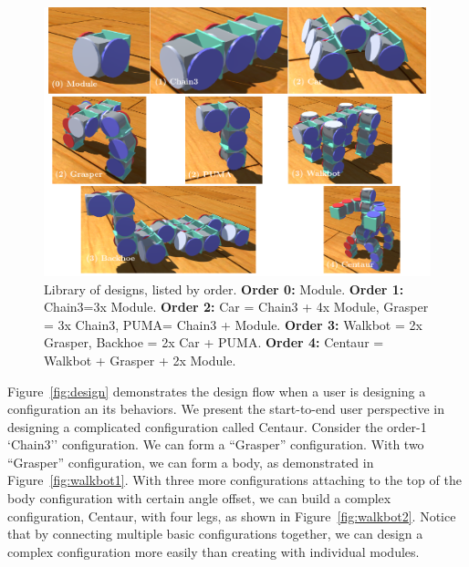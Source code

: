 \documentclass[graybox]{svmult}
\begin{document}
\begin{figure}
  \begin{center}
    \includegraphics[width=\textwidth]{images/library/bigGrid.pdf}
    \caption{Library of designs, listed by order. 
    \textbf{Order 0:} Module. \textbf{Order 1:} Chain3=3x Module.
    \textbf{Order 2:} Car = Chain3 + 4x Module, Grasper = 3x Chain3, PUMA= Chain3 + Module.
    \textbf{Order 3:} Walkbot = 2x Grasper, Backhoe = 2x Car + PUMA.
    \textbf{Order 4:} Centaur = Walkbot + Grasper + 2x Module.}
    \label{fig:library}
  \end{center}
\end{figure}



Figure~\ref{fig:design} demonstrates the design flow when a user is designing a configuration an its behaviors. We present the start-to-end user perspective in designing a complicated configuration called Centaur. Consider the
order-1 `Chain3'' configuration. We can form a ``Grasper'' configuration. With two ``Grasper'' configuration, we can form a body, as demonstrated in Figure~\ref{fig:walkbot1}. With three more configurations attaching to the top of the body configuration with certain angle offset, we can build a complex configuration, Centaur, with four legs, as shown in Figure~\ref{fig:walkbot2}. Notice that by connecting multiple  basic configurations together, we can design a complex configuration more easily than creating with individual modules.
\end{document}
